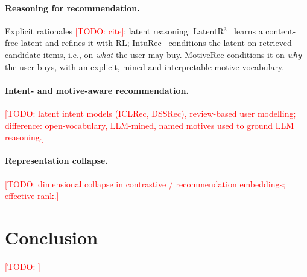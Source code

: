 \documentclass[10pt,twocolumn]{article}
\newcommand{\todo}[1]{\textcolor{red}{[TODO: #1]}}
\begin{document}
\paragraph{Reasoning for recommendation.} Explicit rationales \todo{cite}; latent reasoning:
LatentR$^3$~\citep{r3} learns a content-free latent and refines it with RL; IntuRec~\citep{inturec}
conditions the latent on retrieved candidate items, i.e., on \emph{what} the user may buy. MotiveRec
conditions it on \emph{why} the user buys, with an explicit, mined and interpretable motive vocabulary.
\paragraph{Intent- and motive-aware recommendation.} \todo{latent intent models (ICLRec, DSSRec), review-based
user modelling; difference: open-vocabulary, LLM-mined, named motives used to ground LLM reasoning.}
\paragraph{Representation collapse.} \todo{dimensional collapse in contrastive / recommendation
embeddings; effective rank.}

\section{Conclusion}
\todo{}



\end{document}
